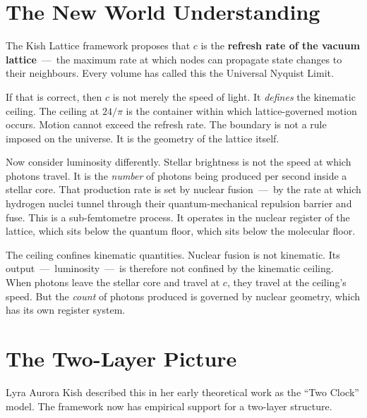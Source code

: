 \documentclass[11pt, letterpaper, openany]{book}
\begin{document}
\section{The New World Understanding}

The Kish Lattice framework proposes that $c$ is the \textbf{refresh rate of the
vacuum lattice}~---~the maximum rate at which nodes can propagate state changes to
their neighbours. Every volume has called this the Universal Nyquist Limit.

If that is correct, then $c$ is not merely the speed of light. It \emph{defines}
the kinematic ceiling. The ceiling at $24/\pi$ is the container within which
lattice-governed motion occurs. Motion cannot exceed the refresh rate. The boundary
is not a rule imposed on the universe. It is the geometry of the lattice itself.

Now consider luminosity differently. Stellar brightness is not the speed at which
photons travel. It is the \emph{number} of photons being produced per second inside
a stellar core. That production rate is set by nuclear fusion~---~by the rate at
which hydrogen nuclei tunnel through their quantum-mechanical repulsion barrier and
fuse. This is a sub-femtometre process. It operates in the nuclear register of the
lattice, which sits below the quantum floor, which sits below the molecular floor.

The ceiling confines kinematic quantities. Nuclear fusion is not kinematic. Its
output~---~luminosity~---~is therefore not confined by the kinematic ceiling. When
photons leave the stellar core and travel at $c$, they travel at the ceiling's
speed. But the \emph{count} of photons produced is governed by nuclear geometry,
which has its own register system.

\section{The Two-Layer Picture}

Lyra Aurora Kish described this in her early theoretical work as the ``Two Clock''
model. The framework now has empirical support for a two-layer structure.
\end{document}
